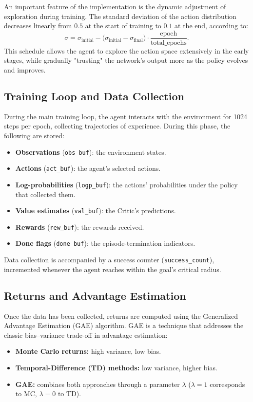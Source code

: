 \documentclass[11pt]{article}
\begin{document}
An important feature of the implementation is the dynamic adjustment of exploration during training. The
standard deviation of the action distribution decreases linearly from $0.5$ at the start of training to
$0.1$ at the end, according to:
\begin{equation}
\sigma = \sigma_{\text{initial}} - \bigl(\sigma_{\text{initial}} - \sigma_{\text{final}}\bigr)\cdot
\frac{\text{epoch}}{\text{total\_epochs}}.
\end{equation}
This schedule allows the agent to explore the action space extensively in the early stages, while
gradually "trusting" the network's output more as the policy evolves and improves.

\subsection{Training Loop and Data Collection}

During the main training loop, the agent interacts with the environment for 1024 steps per epoch,
collecting trajectories of experience. During this phase, the following are stored:
\begin{itemize}
  \item \textbf{Observations} (\texttt{obs\_buf}): the environment states.
  \item \textbf{Actions} (\texttt{act\_buf}): the agent's selected actions.
  \item \textbf{Log-probabilities} (\texttt{logp\_buf}): the actions' probabilities under the policy that
  collected them.
  \item \textbf{Value estimates} (\texttt{val\_buf}): the Critic's predictions.
  \item \textbf{Rewards} (\texttt{rew\_buf}): the rewards received.
  \item \textbf{Done flags} (\texttt{done\_buf}): the episode-termination indicators.
\end{itemize}
Data collection is accompanied by a success counter (\texttt{success\_count}), incremented whenever the
agent reaches within the goal's critical radius.

\subsection{Returns and Advantage Estimation}

Once the data has been collected, returns are computed using the Generalized Advantage Estimation (GAE)
algorithm. GAE is a technique that addresses the classic bias--variance trade-off in advantage
estimation:
\begin{itemize}
  \item \textbf{Monte Carlo returns:} high variance, low bias.
  \item \textbf{Temporal-Difference (TD) methods:} low variance, higher bias.
  \item \textbf{GAE:} combines both approaches through a parameter $\lambda$ ($\lambda=1$ corresponds to
  MC, $\lambda=0$ to TD).
\end{itemize}
\end{document}
